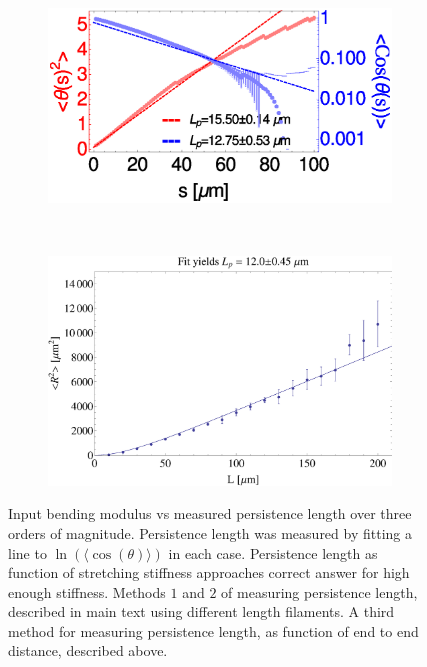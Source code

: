 \documentclass[12pt]{article}
\begin{document}
\begin{figure}[H]
  ~
  \begin{subfigure}{0.6\textwidth}
    \centering
    \includegraphics[width=\textwidth]{figs/filament/sAvgd_L1-100.eps}
    \caption{\label{fig:lp_vs_l}}
  \end{subfigure}
  ~
  \begin{subfigure}{0.4\textwidth}
    \centering
    \includegraphics[width=\textwidth]{figs/filament/R2vsL.eps}
    \caption{\label{fig:R2}}
  \end{subfigure}
  \label{fig:wlc_supp}
  \caption{
   Input bending modulus vs measured persistence length over three orders of magnitude. Persistence
  length was measured by fitting a line to $\ln{(\langle \cos{(\theta)}\rangle)}$ in each case.
    Persistence length as function of stretching stiffness approaches correct answer for high
  enough stiffness. 
  Methods $1$ and $2$ of measuring persistence length, described in main text using different length
  filaments.
   A third method for measuring persistence length, as function of end to end distance, described above.
}
\end{figure}
\end{document}
